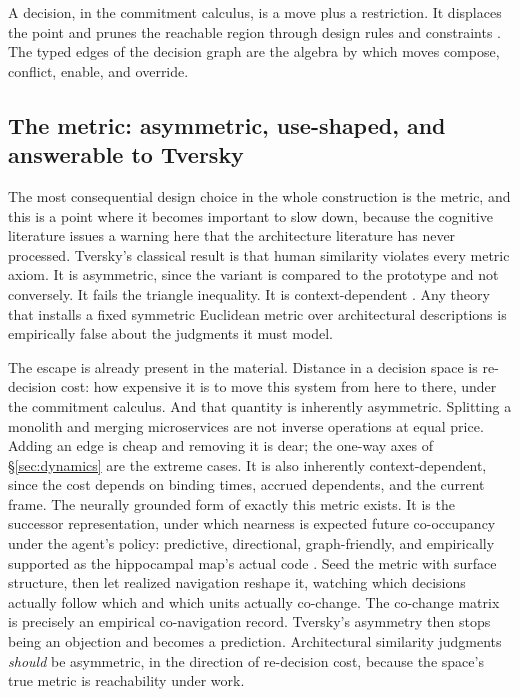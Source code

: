 \documentclass[11pt,oneside]{article}
\theoremstyle{definition}
\begin{document}
A decision, in the commitment calculus, is a move plus a restriction. It displaces the point and
prunes the reachable region through design rules and constraints \cite{jansenbosch2005}. The
typed edges of the decision graph \cite{kruchten2004} are the algebra by which moves compose,
conflict, enable, and override.

\subsection{The metric: asymmetric, use-shaped, and answerable to Tversky}\label{sec:metric}

The most consequential design choice in the whole construction is the metric, and this is a
point where it becomes important to slow down, because the cognitive literature issues a warning
here that the architecture literature has never processed. Tversky's classical result is that
human similarity violates every metric axiom. It is asymmetric, since the variant is compared to
the prototype and not conversely. It fails the triangle inequality. It is context-dependent
\cite{tversky1977}. Any theory that installs a fixed symmetric Euclidean metric over
architectural descriptions is empirically false about the judgments it must model.

The escape is already present in the material. Distance in a decision space is re-decision
cost: how expensive it is to move this system from here to there, under the commitment
calculus. And that quantity is inherently asymmetric. Splitting a monolith and merging
microservices are not inverse operations at equal price. Adding an edge is cheap and removing
it is dear; the one-way axes of \S\ref{sec:dynamics} are the extreme cases. It is also
inherently context-dependent, since the cost depends on binding times, accrued dependents, and
the current frame. The neurally grounded form of exactly this metric exists. It is the
successor representation, under which nearness is expected future co-occupancy under the
agent's policy: predictive, directional, graph-friendly, and empirically supported as the
hippocampal map's actual code \cite{dayan1993,stachenfeld2017}. Seed the metric with surface
structure, then let realized navigation reshape it, watching which decisions actually follow
which and which units actually co-change. The co-change matrix is precisely an empirical
co-navigation record. Tversky's asymmetry then stops being an objection and becomes a
prediction. Architectural similarity judgments \emph{should} be asymmetric, in the direction of
re-decision cost, because the space's true metric is reachability under work.
\end{document}
